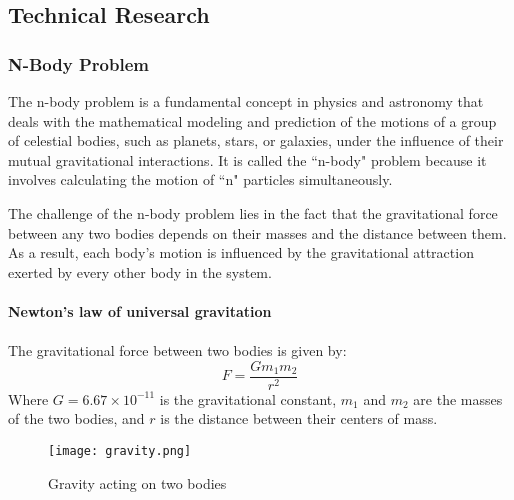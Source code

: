 \documentclass[12pt]{article}
\begin{document}
\newpage
\subsection{Technical Research}

\subsubsection{N-Body Problem}

The n-body problem is a fundamental concept in physics and astronomy that deals with the mathematical modeling and prediction of the motions of a group of celestial bodies, such as planets, stars, or galaxies, under the influence of their mutual gravitational interactions. It is called the ``n-body" problem because it involves calculating the motion of ``n" particles simultaneously.

The challenge of the n-body problem lies in the fact that the gravitational force between any two bodies depends on their masses and the distance between them. As a result, each body's motion is influenced by the gravitational attraction exerted by every other body in the system. 

\paragraph{Newton's law of universal gravitation}
\paragraph{}
The gravitational force between two bodies is given by\cite{nbody}:
\begin{equation}
    F = \frac{Gm_1m_2}{r^2} 
\end{equation}
Where $G = 6.67 \times 10^{-11}$ is the gravitational constant, $m_1$ and $m_2$ are the masses of the two bodies, and $r$ is the distance between their centers of mass. 

\begin{figure}[!htb]
  \centering
  \texttt{[image: gravity.png]}
  \caption{Gravity acting on two bodies}\label{Fig:Figure 10}
\end{figure}
\end{document}
